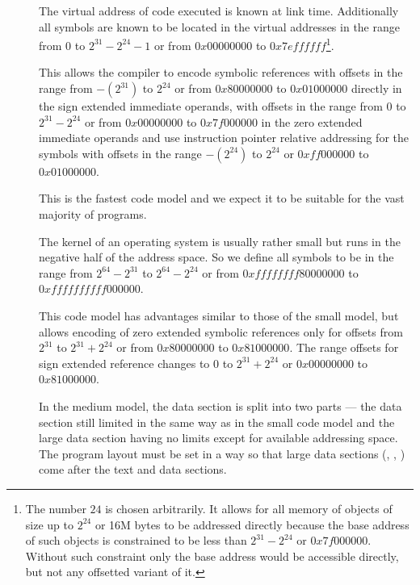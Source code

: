 \begin{description}
\item[]
  The virtual address of code executed is known at link time.
  Additionally all symbols are known to be located in the virtual
  addresses in the range from $0$ to $2^{31}-2^{24}-1$ or from $0x00000000$ to $0x7effffff$\footnote{
    The number $24$ is chosen arbitrarily.  It allows for all memory of
    objects of size up to $2^{24}$ or 16M bytes to be addressed directly because the
    base address of such objects is constrained to be less than $2^{31}-2^{24}$ or $0x7f000000$.
    Without such constraint only the base address would be accessible
    directly, but not any offsetted variant of it.}.

  This allows the compiler to encode symbolic references with offsets
  in the range from $-(2^{31})$ to $2^{24}$ or from $0x80000000$ to $0x01000000$ directly in the sign
  extended immediate operands, with offsets in the range from $0$ to
  $2^{31}-2^{24}$ or from $0x00000000$ to $0x7f000000$ in the zero extended immediate operands and use
  instruction pointer relative addressing for the symbols with offsets
  in the range $-(2^{24})$ to $2^{24}$ or $0xff000000$ to $0x01000000$.

  This is the fastest code model and we expect it to be suitable for
  the vast majority of programs.

\item[]

  The kernel of an operating system is usually rather small but runs
  in the negative half of the address space.  So we define all symbols
  to be in the range from $2^{64}-2^{31}$ to $2^{64}-2^{24}$ or from $0xffffffff80000000$ to $0xffffffffff000000$.

  This code model has advantages similar to those of the small model,
  but allows encoding of zero extended symbolic references only for
  offsets from $2^{31}$ to $2^{31}+2^{24}$ or from $0x80000000$ to $0x81000000$. The range offsets for
  sign extended reference changes to $0$ to $2^{31}+2^{24}$ or $0x00000000$ to $0x81000000$.

\item[]

  In the medium model, the data section is split into two parts --- the
  data section still limited in the same way as in the small code model
  and the large data section having no limits except for available
  addressing space.  The program layout must be set in a way so that
  large data sections (, , )
  come after the text and data sections.


\end{description}
